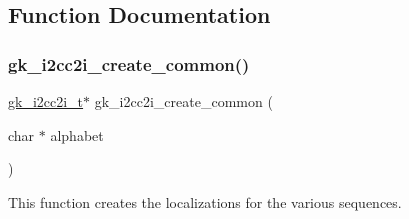 \subsection{Function Documentation}
\mbox{\label{a00137_a8b9f1e33d58df397a7f0f923a25ec256}} 
\subsubsection{\texorpdfstring{gk\+\_\+i2cc2i\+\_\+create\+\_\+common()}{gk\_i2cc2i\_create\_common()}}
{\footnotesize\ttfamily \hyperlink{a00670}{gk\+\_\+i2cc2i\+\_\+t}$\ast$ gk\+\_\+i2cc2i\+\_\+create\+\_\+common (\begin{DoxyParamCaption}\item[{char $\ast$}]{alphabet }\end{DoxyParamCaption})}



This function creates the localizations for the various sequences. 


